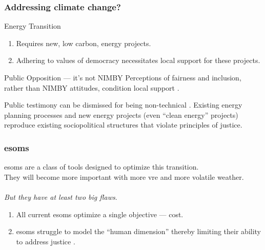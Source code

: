 \begin{frame}
    \frametitle{Addressing climate change?}

        \begin{block}{Energy Transition}
            \begin{enumerate}
                \item Requires new, low carbon, energy projects.
                \item Adhering to values of democracy necessitates local support
                for these projects.
            \end{enumerate}
        \end{block}
        \begin{block}{Public Opposition --- it's not NIMBY}
            Perceptions of fairness and inclusion, rather than NIMBY attitudes,
            condition local support
            \cite{konisky_proximity_2021,aitken_why_2010,stokes_prevalence_2023,firestone_public_2012-1}.
        \end{block}
        \begin{block}{}
            Public testimony can be dismissed for being non-technical
            \cite{johnson_dakota_2021}. Existing energy planning processes and
            new energy projects (even ``clean energy'' projects) reproduce
            existing sociopolitical structures that violate principles of
            justice.
        \end{block}
\end{frame}

\begin{frame}
    \frametitle{\glspl{esom}}
    \Glspl{esom} are a class of tools designed to 
    optimize this transition.
    \\

    They will become more important with more \gls{vre}
    and more volatile weather.
    \\\\
    \textit{But they have at least two big flaws}.
    \begin{enumerate}[<+->]
        \item All current \glspl{esom} optimize a single objective --- cost.
        \item \glspl{esom} struggle to model the ``human dimension'' thereby
        limiting their ability to address justice \cite{pfenninger_energy_2014}.
    \end{enumerate}
\end{frame}

